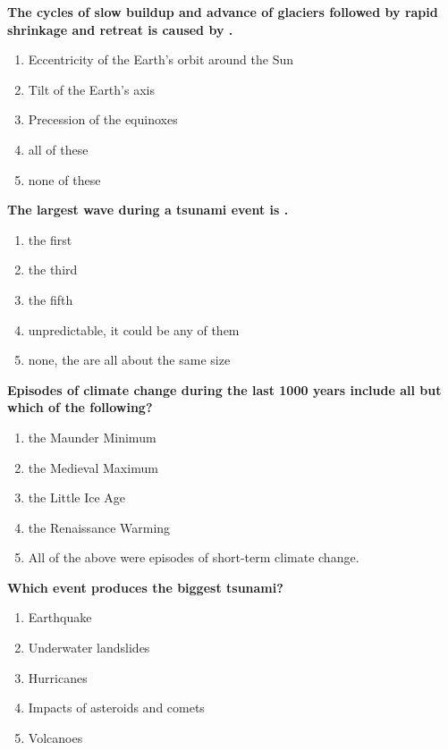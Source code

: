 \item {
\setlength{\itemsep}{0cm}
\setlength{\parskip}{.2cm}
\begin{samepage}
\textbf{
The cycles of slow buildup and advance of glaciers followed by rapid shrinkage and retreat is caused by \makebox[1cm]{\Rivpt\hrulefill\Rivpt}.
}
\begin{enumerate}
\item {  Eccentricity of the Earth's orbit around the Sun  }
\item {  Tilt of the Earth's axis }
\item {  Precession of the equinoxes  }
\item {  all of these }
\item {  none of these }
\end{enumerate}
\end{samepage}
}
\item {
\setlength{\itemsep}{0cm}
\setlength{\parskip}{.2cm}
\begin{samepage}
\textbf{
The largest wave during a tsunami event is \makebox[1cm]{\Rivpt\hrulefill\Rivpt}.
}
\begin{enumerate}
\item { 	the first }
\item { 	the third }
\item { 	the fifth }
\item { 	unpredictable, it could be any of them }
\item { 	none, the are all about the same size 		 }
\end{enumerate}
\end{samepage}
}
\item {
\setlength{\itemsep}{0cm}
\setlength{\parskip}{.2cm}
\begin{samepage}
\textbf{
Episodes of climate change during the last 1000 years include all but which of the following?
}
\begin{enumerate}
\item {  the Maunder Minimum }
\item {  the Medieval Maximum }
\item {  the Little Ice Age }
\item {  the Renaissance Warming }
\item {  All of the above were episodes of short-term climate change. }
\end{enumerate}
\end{samepage}
}
\item {
\setlength{\itemsep}{0cm}
\setlength{\parskip}{.2cm}
\begin{samepage}
\textbf{
Which event produces the biggest tsunami?
}
\begin{enumerate}
\item { 	Earthquake }
\item { 	Underwater landslides }
\item { 	Hurricanes }
\item { 	Impacts of asteroids and comets }
\item { 	Volcanoes 		 }
\end{enumerate}
\end{samepage}
}
